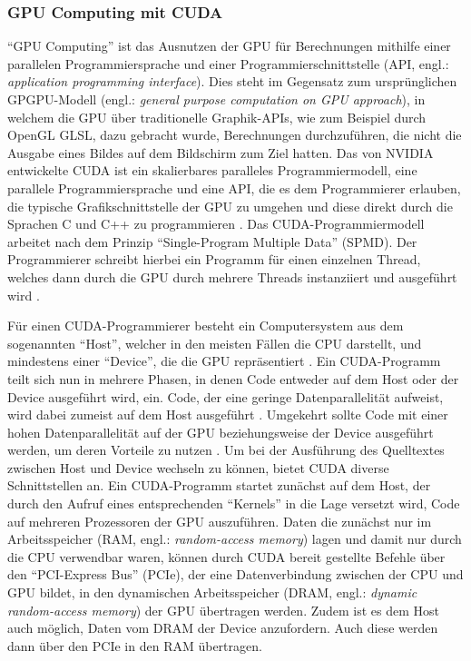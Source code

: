 \documentclass[crop=false]{standalone}
\begin{document}
      \subsubsection{GPU Computing mit CUDA} %
      \label{ssub:gpu_computing_mit_cuda}
        \enquote{GPU Computing} ist das Ausnutzen der GPU für Berechnungen mithilfe einer parallelen Programmiersprache und einer Programmierschnittstelle (API, engl.: \textit{application programming interface}).
        Dies steht im Gegensatz zum ursprünglichen GPGPU-Modell (engl.: \textit{general purpose computation on GPU approach}), in welchem die GPU über traditionelle Graphik-APIs, wie zum Beispiel durch OpenGL GLSL, dazu gebracht wurde, Berechnungen durchzuführen, die nicht die Ausgabe eines Bildes auf dem Bildschirm zum Ziel hatten.
        Das von NVIDIA entwickelte CUDA ist ein skalierbares paralleles Programmiermodell, eine parallele Programmiersprache und  eine API, die es dem Programmierer erlauben, die typische Grafikschnittstelle der GPU zu umgehen und diese direkt durch die Sprachen C und C++ zu programmieren \cite[S.~A5]{Patterson2011}.
        Das CUDA-Programmiermodell arbeitet nach dem Prinzip \enquote{Single-Program Multiple Data} (SPMD).
        Der Programmierer schreibt hierbei ein Programm für einen einzelnen Thread, welches dann durch die GPU durch mehrere Threads instanziiert und ausgeführt wird \cite[S.~A5]{Patterson2011}.

        Für einen CUDA-Programmierer besteht ein Computersystem aus dem sogenannten \enquote{Host}, welcher in den meisten Fällen die CPU darstellt, und mindestens einer \enquote{Device}, die die GPU repräsentiert \cite[S.~39]{Kirk2010}.
        Ein CUDA-Programm teilt sich nun in mehrere Phasen, in denen Code entweder auf dem Host oder der Device ausgeführt wird, ein.
        Code, der eine geringe Datenparallelität aufweist, wird dabei zumeist auf dem Host ausgeführt \cite{Kirk2010}.
        Umgekehrt sollte Code mit einer hohen Datenparallelität auf der GPU beziehungsweise der Device ausgeführt werden, um deren Vorteile zu nutzen \cite{Kirk2010}.
        Um bei der Ausführung des Quelltextes zwischen Host und Device wechseln zu können, bietet CUDA diverse Schnittstellen an.
        Ein CUDA-Programm startet zunächst auf dem Host, der durch den Aufruf eines entsprechenden \enquote{Kernels} in die Lage versetzt wird, Code auf mehreren Prozessoren der GPU auszuführen.
        Daten die zunächst nur im Arbeitsspeicher (RAM, engl.: \textit{random-access memory}) lagen und damit nur durch die CPU verwendbar waren, können durch CUDA bereit gestellte Befehle über den \enquote{PCI-Express Bus} (PCIe), der eine Datenverbindung zwischen der CPU und GPU bildet, in den dynamischen Arbeitsspeicher (DRAM, engl.: \textit{dynamic random-access memory}) der GPU übertragen werden.
        Zudem ist es dem Host auch möglich, Daten vom DRAM der Device anzufordern.
        Auch diese werden dann über den PCIe in den RAM übertragen.
        \cite{Sanders2011}
\end{document}
